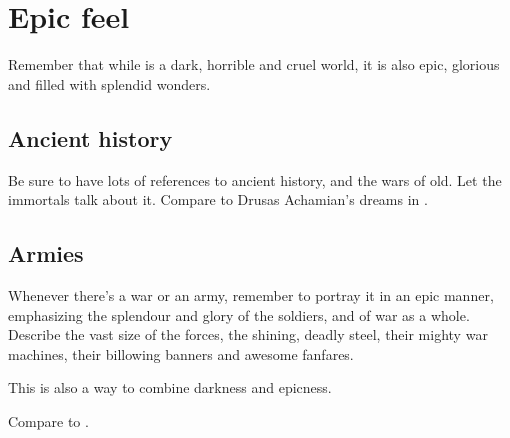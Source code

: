 \section{Epic feel}
Remember that while \Miith{} is a dark, horrible and cruel world, it is also epic, glorious and filled with splendid wonders. 









\subsection{Ancient history}
Be sure to have lots of references to ancient history, and the wars of old. 
Let the immortals talk about it. 
Compare to Drusas Achamian's dreams in . 







\subsection{Armies}
Whenever there's a war or an army, remember to portray it in an epic manner, emphasizing the splendour and glory of the soldiers, and of war as a whole. Describe the vast size of the forces, the shining, deadly steel, their mighty war machines, their billowing banners and awesome fanfares.

This is also a way to combine darkness and epicness. 

Compare to . 











